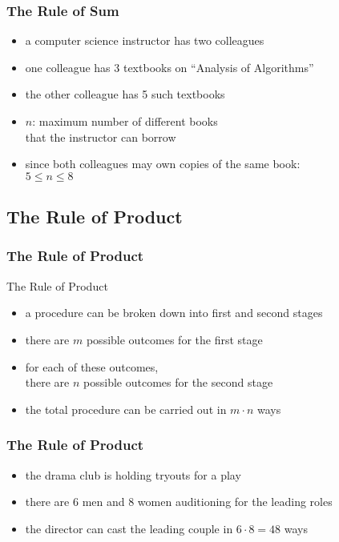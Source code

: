 \documentclass[dvipsnames]{beamer}
\begin{document}
\begin{frame}
  \frametitle{The Rule of Sum}

  \begin{example}
    \begin{itemize}
      \item a computer science instructor has two colleagues
      \item one colleague has 3 textbooks on ``Analysis of Algorithms''
      \item the other colleague has 5 such textbooks

      \medskip
      \item $n$: maximum number of different books\\
        that the instructor can borrow
      \item since both colleagues may own copies of the same book:\\
        $5 \leq n \leq 8$
   \end{itemize}
  \end{example}
\end{frame}

\subsection{The Rule of Product}

\begin{frame}
  \frametitle{The Rule of Product}

  \begin{block}{The Rule of Product}
    \begin{itemize}
      \item a procedure can be broken down into first and second stages
      \item there are $m$ possible outcomes for the first stage
      \item for each of these outcomes,\\
        there are $n$ possible outcomes for the second stage

      \medskip
      \item the total procedure can be carried out in $m \cdot n$ ways
    \end{itemize}
  \end{block}
\end{frame}

\begin{frame}
  \frametitle{The Rule of Product}

  \begin{example}
    \begin{itemize}
      \item the drama club is holding tryouts for a play
      \item there are 6 men and 8 women auditioning for the leading roles

      \medskip
      \item the director can cast the leading couple in
        $6 \cdot 8 = 48$ ways
    \end{itemize}
  \end{example}
\end{frame}
\end{document}
